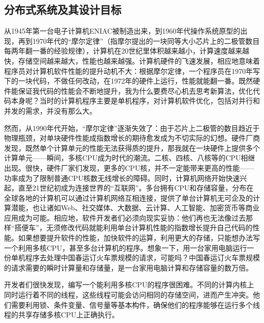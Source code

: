 \documentclass[UTF8,AutoFakeBold=1,AutoFakeSlant,zihao=-4]{cucthesis}
\begin{document}
\subsection{分布式系统及其设计目标}

从1945年第一台电子计算机ENIAC被制造出来，到1960年代操作系统原型的出现，再到1970年代的“摩尔定律”（指摩尔提出的一块同等大小芯片上的二极管数目每两年翻一番的经验规律），计算机在20世纪里体积越来越小，计算速度越来越快，存储空间越来越大，性能也越来越强。计算机硬件的飞速发展，相应地意味着程序员对计算机软件性能的提升动机不大：根据摩尔定律，一个程序员在1970年写下的一块代码，不做任何改动，在1972年的硬件上运行，性能就能翻一番。既然硬件能保证我代码的性能会不断地提升，我为什么要费尽心机去思考新算法，优化代码本身呢？当时的计算机程序主要是单机程序，对计算机软件优化，包括对并行和并发的需求，并没有那么大。

然而，从1990年代开始，“摩尔定律”逐渐失效了：由于芯片上二极管的数目趋近于物理瓶颈，对单块硬件性能成指数增长的期待愈发成为不切实际的幻想。硬件厂商发现，既然单个计算单元的性能无法获得质的提升，那我就在一块硬件上提供多个计算单元——瞬间，多核CPU成为时代的潮流。二核、四核、八核等的CPU相继出现。很快，硬件厂家们发现，更多的CPU核，并不一定能带来更高的性能——功率成为了限制普通CPU核数无线增长的障碍。同时，计算机网络开始快速兴起，直至21世纪初成为连接世界的“互联网”。多台拥有CPU和存储容量，分布在全球各地的计算机可以通过计算机网络互相连接，提供了单台计算机无可企及的计算潜能，也让诸如Web、社交媒体、大数据、云计算、人工智能、加密货币等商业应用成为可能。相应地，软件开发者们必须向现实妥协：他们再也无法像过去那样“搭便车”，无须修改代码就能利用单台计算机性能的指数增长提升自己代码的性能。如果想要提升软件的性能，加快软件的运算，利用更大的存储，只能想办法写一个利用多核CPU，甚至多台计算机的程序。想象一下，用一台家用电脑运行一份单机程序去处理中国春运订火车票规模的请求，可能吗？中国春运订火车票规模的请求需要的瞬时计算量和存储量，是一台家用电脑计算和存储容量的数万倍。

开发者们很快发现，编写一个能利用多核CPU的程序很困难。不同的计算内核上同时运行着不同的线程，这些线程可能会访问相同的存储空间，进而产生冲突。他们需要利用锁、条件变量、信号量等基本构件，确保他们的程序能够在运行多个线程的共享存储多核CPU上正确执行。
\end{document}
